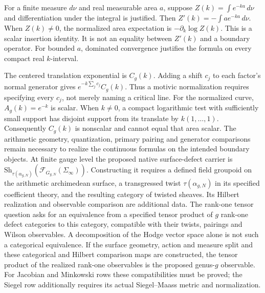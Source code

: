 \begin{remark}
\label{v4-arith:w9-r6:rem:wilson-surface-realisation}
For a finite measure \(d\nu\) and real measurable area \(a\), suppose
\(Z(k)=\int e^{-ka}\,d\nu\) and differentiation under the integral
is justified. Then \(Z'(k)=-\int a e^{-ka}\,d\nu\).
When \(Z(k)\ne0\), the normalized area expectation is
\(-\partial_k\log Z(k)\). This is a scalar insertion identity.
It is not an equality between \(Z'(k)\) and a boundary operator.
For bounded \(a\), dominated convergence justifies the formula
on every compact real \(k\)-interval.
\end{remark}

\begin{remark}
\label{v4-arith:w9-r6:rem:independence-wilson-surface}
The centered translation exponential is \(C_g(k)\).
Adding a shift \(c_j\) to each factor's normal generator gives
\(e^{-k\sum_jc_j}C_g(k)\). Thus a motivic normalization requires
specifying every \(c_j\), not merely naming a critical line.
For the normalized curve, \(A_g(k)=e^{-k}\) is scalar.
When \(k\ne0\), a compact logarithmic test with sufficiently small
support has disjoint support from its translate by \(k(1,\ldots,1)\).
Consequently \(C_g(k)\) is nonscalar and cannot equal that area scalar.
The arithmetic geometry, quantization, primary pairing and generator
comparisons remain necessary to realize the continuous formulas on
the intended boundary objects.
At finite gauge level the proposed native surface-defect carrier is
$\mathrm{Sh}_{\tau(\alpha_{g,N})}
(\mathcal F_{G_{g,N}}(\Sigma_\infty))$.
Constructing it requires a defined field groupoid on the arithmetic
archimedean surface, a transgressed twist $\tau(\alpha_{g,N})$ in its
specified coefficient theory, and the resulting category of twisted
sheaves. Its Hilbert realization and observable comparison are
additional data. The rank-one tensor question asks for an equivalence
from a specified tensor product of $g$ rank-one defect categories to
this category, compatible with their twists, pairings and Wilson
observables. A decomposition of the Hodge vector space alone is not
such a categorical equivalence. If the surface geometry, action and
measure split and these categorical and Hilbert comparison maps are
constructed, the tensor product of the realized rank-one observables
is the proposed genus-$g$ observable. For Jacobian and Minkowski
rows these compatibilities must be proved; the Siegel row additionally
requires its actual Siegel--Maass metric and normalization.
\end{remark}
